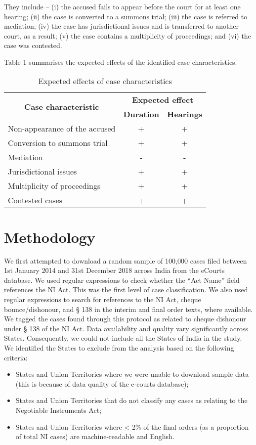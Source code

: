\documentclass[12pt,a4paper]{article}
\begin{document}
They include – (i) the accused fails to appear before the court for at least one hearing; (ii) the case is converted to a summons trial; (iii) the case is referred to mediation; (iv) the case has jurisdictional issues and is transferred to another court, as a result; (v) the case contains a multiplicity of proceedings; and (vi) the case was contested.

Table 1 summarises the expected effects of the identified case characteristics.

\begin{longtable}{@{}lcc@{}}
\caption{Expected effects of case characteristics}
\label{tab:expected}\\
\toprule
\multicolumn{1}{c}{\multirow{2}{*}{\textbf{Case characteristic}}} & \multicolumn{2}{c}{\textbf{Expected effect}} \\ \cmidrule(l){2-3} 
\multicolumn{1}{c}{} & \textbf{Duration} & \textbf{Hearings} \\ \midrule
Non-appearance of the accused & + & + \\
Conversion to summons trial & + & + \\
Mediation & - & - \\
Jurisdictional issues & + & + \\
Multiplicity of proceedings & + & + \\
Contested cases & + & + \\ \bottomrule
\end{longtable}

\section{Methodology}

We first attempted to download a random sample of 100,000 cases filed between 1st January 2014 and 31st December 2018 across India from the eCourts database. We used regular expressions to check whether the “Act Name” field references the NI Act. This was the first level of case classification. We also used regular expressions to search for references to the NI Act, cheque bounce/dishonour, and § 138 in the interim and final order texts, where available. We tagged the cases found through this protocol as related to cheque dishonour under § 138 of the NI Act. Data availability and quality vary significantly across States. Consequently, we could not include all the States of India in the study. We identified the States to exclude from the analysis based on the following criteria:

\begin{itemize}
    \item States and Union Territories where we were unable to download sample data (this is because of data quality of the e-courts database);
    \item States and Union Territories that do not classify any cases as relating to the Negotiable Instruments Act;
    \item States and Union Territories where < 2\% of the final orders (as a proportion of total NI cases) are machine-readable and English.
\end{itemize}
\end{document}
